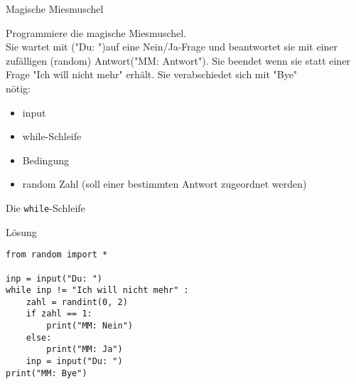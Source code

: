 \begin{frame}{Magische Miesmuschel}

	Programmiere die magische Miesmuschel.\\ Sie wartet mit ("Du: ")auf eine Nein/Ja-Frage und beantwortet sie mit einer zufälligen (random) Antwort("MM: Antwort"). Sie beendet wenn sie statt einer Frage "Ich will nicht mehr" erhält. Sie verabschiedet sich mit "Bye"\\
	nötig:
	\begin{itemize}
		\item input
		\item while-Schleife
		\item Bedingung
		\item random Zahl (soll einer bestimmten Antwort zugeordnet werden)
	\end{itemize}	
\end{frame}

\begin{frame}[fragile]{Die \texttt{while}-Schleife}
\begin{exampleblock}{Lösung}
\begin{lstlisting}
from random import *

inp = input("Du: ")
while inp != "Ich will nicht mehr" :
	zahl = randint(0, 2)
	if zahl == 1:
		print("MM: Nein")
	else:
		print("MM: Ja")
	inp = input("Du: ")
print("MM: Bye")
\end{lstlisting}
\end{exampleblock}
\end{frame}


